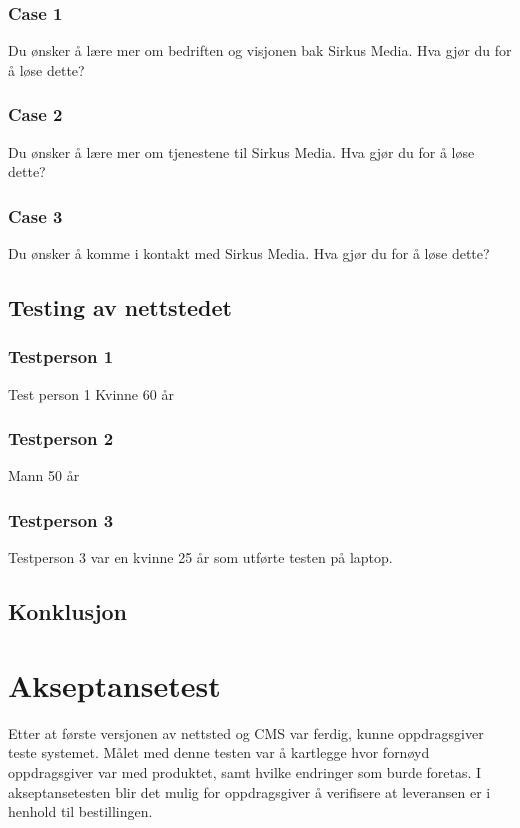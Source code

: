 \subsubsection{Case 1}
Du ønsker å lære mer om bedriften og visjonen bak Sirkus Media. Hva gjør du for å løse dette?

\subsubsection{Case 2}
Du ønsker å lære mer om tjenestene til Sirkus Media. Hva gjør du for å løse dette?

\subsubsection{Case 3}
Du ønsker å komme i kontakt med Sirkus Media. Hva gjør du for å løse dette?

\subsection{Testing av nettstedet}

\subsubsection{Testperson 1}
Test person 1
Kvinne 60 år

\subsubsection{Testperson 2}
Mann 50 år

\subsubsection{Testperson 3}
Testperson 3 var en kvinne 25 år som utførte testen på laptop.

\subsection{Konklusjon}


\section{Akseptansetest}
Etter at første versjonen av nettsted og CMS var ferdig, kunne oppdragsgiver teste systemet. Målet med denne testen var å kartlegge hvor fornøyd oppdragsgiver var med produktet, samt hvilke endringer som burde foretas. I akseptansetesten blir det mulig for oppdragsgiver å verifisere at leveransen er i henhold til bestillingen. 

